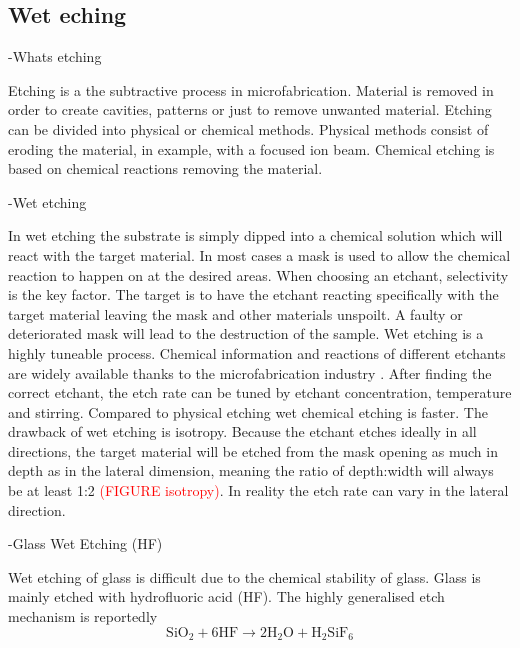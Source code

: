 \documentclass[final]{jyflluk}
\begin{document}
\subsection{Wet eching}
\label{sec:xx4}
-Whats etching

Etching is a the subtractive process in microfabrication. Material is removed in order to create cavities, patterns or just to remove unwanted material. Etching can be divided into physical or chemical methods. Physical methods consist of eroding the material, in example, with a focused ion beam. Chemical etching is based on chemical reactions removing the material. 

-Wet etching 

In wet etching the substrate is simply dipped into a chemical solution which will react with the target material. In most cases a mask is used to allow the chemical reaction to happen on at the desired areas. When choosing an etchant, selectivity is the key factor. The target is to have the etchant reacting specifically with the target material leaving the mask and other materials unspoilt. A faulty or deteriorated mask will lead to the destruction of the sample. 
Wet etching is a highly tuneable process. Chemical information and reactions of different etchants are widely available thanks to the microfabrication industry \cite{williams2003etch}. After finding the correct etchant, the etch rate can be tuned by etchant concentration, temperature and stirring. Compared to physical etching wet chemical etching is faster. The drawback of wet etching is isotropy. Because the etchant etches ideally in all directions, the target material will be etched from the mask opening as much in depth as in the lateral dimension, meaning the ratio of depth:width will always be at least 1:2 \textcolor{red}{(FIGURE isotropy)}. In reality the etch rate can vary in the lateral direction. \cite{lee2010microfabrication}


-Glass Wet Etching (HF)

Wet etching of glass is difficult due to the chemical stability of glass. Glass is mainly etched with hydrofluoric acid (HF). The highly generalised etch mechanism is reportedly \cite{etch_formula}
\begin{equation}
    \label{eq:HF_etch}
    \mathrm{SiO_2} + \mathrm{6HF} \rightarrow  \mathrm{2H_2 O} + \mathrm{H_2 Si F_6}
\end{equation}
\end{document}
